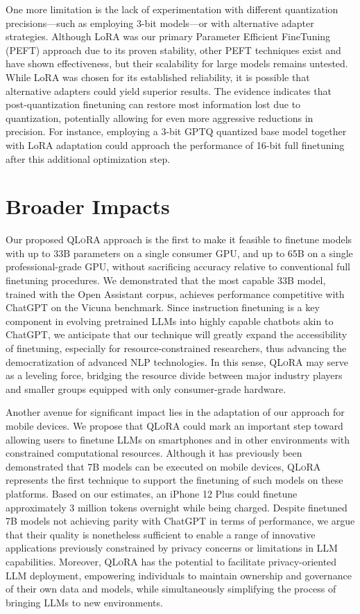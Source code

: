 One more limitation is the lack of experimentation with different quantization precisions—such as employing 3-bit models—or with alternative adapter strategies. Although LoRA was our primary Parameter Efficient FineTuning (PEFT) approach due to its proven stability, other PEFT techniques exist and have shown effectiveness, but their scalability for large models remains untested. While LoRA was chosen for its established reliability, it is possible that alternative adapters could yield superior results. The evidence indicates that post-quantization finetuning can restore most information lost due to quantization, potentially allowing for even more aggressive reductions in precision. For instance, employing a 3-bit GPTQ quantized base model together with LoRA adaptation could approach the performance of 16-bit full finetuning after this additional optimization step.

\section{Broader Impacts}

Our proposed \textsc{QLoRA} approach is the first to make it feasible to finetune models with up to 33B parameters on a single consumer GPU, and up to 65B on a single professional-grade GPU, without sacrificing accuracy relative to conventional full finetuning procedures. We demonstrated that the most capable 33B model, trained with the Open Assistant corpus, achieves performance competitive with ChatGPT on the Vicuna benchmark. Since instruction finetuning is a key component in evolving pretrained LLMs into highly capable chatbots akin to ChatGPT, we anticipate that our technique will greatly expand the accessibility of finetuning, especially for resource-constrained researchers, thus advancing the democratization of advanced NLP technologies. In this sense, \textsc{QLoRA} may serve as a leveling force, bridging the resource divide between major industry players and smaller groups equipped with only consumer-grade hardware.

Another avenue for significant impact lies in the adaptation of our approach for mobile devices. We propose that \textsc{QLoRA} could mark an important step toward allowing users to finetune LLMs on smartphones and in other environments with constrained computational resources. Although it has previously been demonstrated that 7B models can be executed on mobile devices, \textsc{QLoRA} represents the first technique to support the finetuning of such models on these platforms. Based on our estimates, an iPhone 12 Plus could finetune approximately 3 million tokens overnight while being charged. Despite finetuned 7B models not achieving parity with ChatGPT in terms of performance, we argue that their quality is nonetheless sufficient to enable a range of innovative applications previously constrained by privacy concerns or limitations in LLM capabilities. Moreover, \textsc{QLoRA} has the potential to facilitate privacy-oriented LLM deployment, empowering individuals to maintain ownership and governance of their own data and models, while simultaneously simplifying the process of bringing LLMs to new environments.

